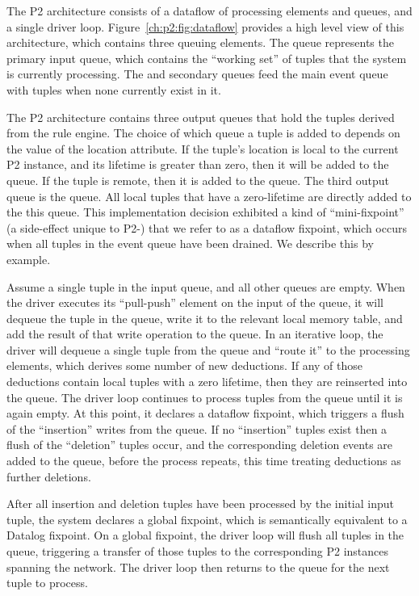 The P2 architecture consists of a dataflow of processing elements and queues,
and a single driver loop.  Figure~\ref{ch:p2:fig:dataflow} provides a high
level view of this architecture, which contains three queuing elements.  The
 queue represents the primary input queue, which contains the
``working set'' of tuples that the system is currently processing.  The
 and  secondary queues feed the main event queue with
tuples when none currently exist in it.

The P2 architecture contains three output queues that hold the tuples derived
from the rule engine.  The choice of which queue a tuple is added to depends on
the value of the location attribute.  If the tuple's location is local to the
current P2 instance, and its lifetime is greater than zero, then it will be
added to the  queue.  If the tuple is remote, then it is added to
the  queue.  The third output queue is the  queue.  All
local tuples that have a zero-lifetime are directly added to the this queue.
This implementation decision exhibited a kind of ``mini-fixpoint'' (a side-effect 
unique to P2-\OVERLOG) that we refer to as a dataflow fixpoint, which
occurs when all tuples in the event queue have been drained.  We describe this
by example.

Assume a single tuple in the  input queue, and all other queues are
empty.  When the driver executes its ``pull-push'' element on the input of the
 queue, it will dequeue the tuple in the  queue, write it
to the relevant local memory table, and add the result of that write operation
to the  queue.  In an iterative loop, the driver will dequeue a
single tuple from the  queue and ``route it'' to the processing
elements, which derives some number of new deductions.  If any of those
deductions contain local tuples with a zero lifetime, then they are reinserted
into the  queue.  The driver loop continues to process tuples from
the  queue until it is again empty.  At this point, it declares a
dataflow fixpoint, which triggers a flush of the ``insertion'' writes from the
 queue.  If no ``insertion'' tuples exist then a flush of the
``deletion'' tuples occur, and the corresponding deletion events are added to
the  queue, before the process repeats, this time treating deductions
as further deletions.

After all insertion and deletion tuples have been processed by the initial
 input tuple, the system declares a global fixpoint, which is
semantically equivalent to a Datalog fixpoint.  On a global fixpoint, the
driver loop will flush all tuples in the  queue, triggering a
transfer of those tuples to the corresponding P2 instances spanning the
network.  The driver loop then returns to the  queue for the next
tuple to process.

